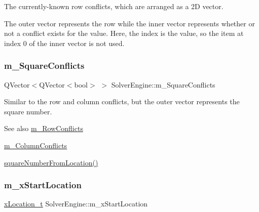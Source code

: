 The currently-\/known row conflicts, which are arranged as a 2D vector. 

The outer vector represents the row while the inner vector represents whether or not a conflict exists for the value. Here, the index is the value, so the item at index 0 of the inner vector is not used. \mbox{\label{class_solver_engine_aec86ecb1c83357d184390a878feca082}} 
\subsubsection{\texorpdfstring{m\+\_\+\+Square\+Conflicts}{m\_SquareConflicts}}
{\footnotesize\ttfamily Q\+Vector$<$Q\+Vector$<$bool$>$ $>$ Solver\+Engine\+::m\+\_\+\+Square\+Conflicts\hspace{0.3cm}{\ttfamily [private]}}



Similar to the row and column conflicts, but the outer vector represents the square number. 

\begin{DoxySeeAlso}{See also}
\mbox{\hyperlink{class_solver_engine_ab2c80d6912f12a59297ff17788eb15ff}{m\+\_\+\+Row\+Conflicts}} 

\mbox{\hyperlink{class_solver_engine_a31443447551a97647ac50f4090c51a3f}{m\+\_\+\+Column\+Conflicts}} 

\mbox{\hyperlink{class_solver_engine_a3b515701f25827a9d817e7ca529f9b80}{square\+Number\+From\+Location()}} 
\end{DoxySeeAlso}
\mbox{\label{class_solver_engine_a82c02cac9a88788427e498ceb87e85d6}} 
\subsubsection{\texorpdfstring{m\+\_\+x\+Start\+Location}{m\_xStartLocation}}
{\footnotesize\ttfamily \mbox{\hyperlink{struct_solver_engine_1_1x_location__t}{x\+Location\+\_\+t}} Solver\+Engine\+::m\+\_\+x\+Start\+Location\hspace{0.3cm}{\ttfamily [private]}}



